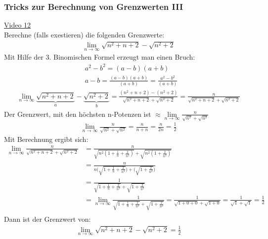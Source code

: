 \subsubsection{Tricks zur Berechnung von Grenzwerten III}
\href{https://youtu.be/KqTM73LzkMo}{Video 12}\\
Berechne (falls exestieren) die folgenden Grenzwerte:\\
\begin{align*}
\lim\limits_ {n\to\infty}\sqrt{n^2+n+2}-\sqrt{n^2+2}
\end{align*}
Mit Hilfe der 3. Binomischen Formel erzeugt man einen Bruch:\\
\begin{align*}
&a^2-b^2=(a-b)(a+b)\\
&a-b=\frac{(a-b)(a+b)}{(a+b)}=\frac{a^2-b^2}{(a+b)}
\end{align*}
\begin{align*}
\lim\limits_ {n\to\infty} \underbrace {\sqrt{n^2+n+2}}_{a}-\underbrace {\sqrt{n^2+2}}_{b}=\frac{(n^2+n+2)-(n^2+2)}{\sqrt{n^2+n+2}+\sqrt{n^2+2}}=\frac{n}{\sqrt{n^2+n+2}+\sqrt{n^2+2}}
\end{align*}
Der Grenzwert, mit den höchsten n-Potenzen ist $ \approx \lim\limits_ {n\to\infty}\frac{n}{\sqrt{n^2}+\sqrt{n^2}}$ \\
\begin{align*}
\lim\limits_ {n\to\infty}\frac{n}{\sqrt{n^2}+\sqrt{n^2}}=\frac{n}{n+n}=\frac{n}{2n}=\frac{1}{2}
\end{align*}
Mit Berechnung ergibt sich:\\
\begin{align*}
\lim\limits_ {n\to\infty}\frac{n}{\sqrt{n^2+n+2}+\sqrt{n^2+2}}&=\frac{n}{\sqrt{n^2(1+\frac{1}{n}+\frac{2}{n^2})}+\sqrt{n^2(1+\frac{2}{n^2})}}\\
&=\frac{n}{n\bigg(\sqrt{1+\frac{1}{n}+\frac{2}{n^2}}\bigg)+\bigg(\sqrt{1+\frac{2}{n^2}}\bigg)}\\
&=\frac{1}{\sqrt{1+\frac{1}{n}+\frac{2}{n^2}}+\sqrt{1+\frac{2}{n^2}}}\\
&=\lim\limits_ {n\to\infty}\frac{1}{\sqrt{1+\frac{1}{n}+\frac{2}{n^2}}+\sqrt{1+\frac{2}{n^2}}}=\frac{1}{\sqrt{1+0+0}+\sqrt{1+0}}=\frac{1}{\sqrt{1}+\sqrt{1}}=\frac{1}{2}\\
\end{align*}
Dann ist der Grenzwert von:\\
\begin{align*}
\lim\limits_ {n\to\infty}\sqrt{n^2+n+2}-\sqrt{n^2+2}=\frac{1}{2}
\end{align*}
